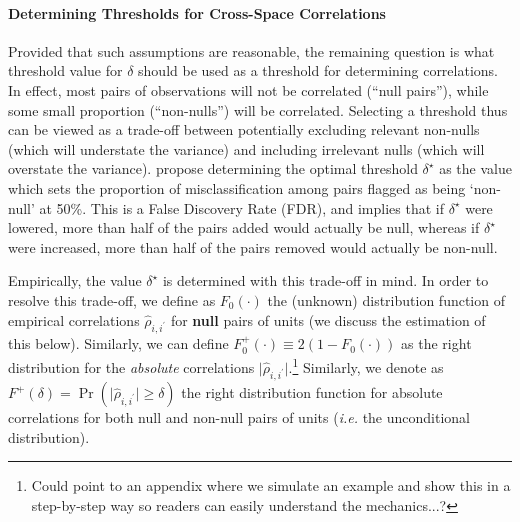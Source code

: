 \documentclass[varwidth,bib]{statapress}
\begin{document}
\paragraph{Determining Thresholds for Cross-Space Correlations} Provided that such assumptions are reasonable, the remaining question is what threshold value for $\delta$ should be used as a threshold for determining correlations.  In effect, most pairs of observations will not be correlated (``null pairs''), while some small proportion (``non-nulls'') will be correlated.  Selecting a threshold thus can be viewed as a trade-off between potentially excluding relevant non-nulls (which will understate the variance) and including irrelevant nulls (which will overstate the variance). \citet{Dellavignaetal2025} propose determining the optimal threshold $\delta^\star$ as the value which sets the proportion of misclassification among pairs flagged as being `non-null' at 50\%.  This is a False Discovery Rate (FDR), and implies that if $\delta^{\star}$ were lowered, more than half of the pairs added would actually be null, whereas if $\delta^\star$ were increased, more than half of the pairs removed would actually be non-null.  %

Empirically, the value $\delta^\star$ is determined with this trade-off in mind.  In order to resolve this trade-off, we define as $F_0(\cdot)$ the (unknown) distribution function of empirical correlations $\widehat\rho_{i,i^\prime}$ for \textbf{null} pairs of units (we discuss the estimation of this below).  Similarly, we can define $F^+_0(\cdot)\equiv2(1-F_0(\cdot))$ as the right distribution for the \textit{absolute} correlations $\lvert\widehat\rho_{i,i^\prime}\rvert$.\footnote{Could point to an appendix where we simulate an example and show this in a step-by-step way so readers can easily understand the mechanics...?}  Similarly, we denote as $F^+(\delta)=\Pr(\lvert\widehat\rho_{i,i^\prime}\rvert\geq\delta)$ the right distribution function for absolute correlations for both null and non-null pairs of units (\textit{i.e.} the unconditional distribution). 
\end{document}
